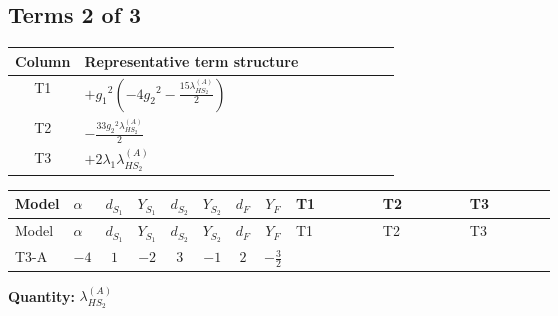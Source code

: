 \documentclass[8pt]{article}
\begin{document}
\begin{landscape}
\subsection*{Terms 2 of 3}
\begin{center}
\begin{tabular}{@{}c >{\raggedright\arraybackslash}p{0.82\linewidth}@{}}
\toprule
Column & Representative term structure \\
\midrule
T1 & \(\displaystyle +{g_1}^2 \left(-4 {g_2}^2-\frac{15 {\lambda_{HS_2}^{(A)}}}{2}\right)\) \\
\midrule
T2 & \(\displaystyle -\frac{33 {g_2}^2 {\lambda_{HS_2}^{(A)}}}{2}\) \\
\midrule
T3 & \(\displaystyle +2 {\lambda_1} {\lambda_{HS_2}^{(A)}}\) \\
\midrule
\bottomrule
\end{tabular}
\end{center}
\smallskip
\tiny
\begin{longtable}{@{}llcccccc >{\raggedright\arraybackslash}p{0.21\linewidth} >{\raggedright\arraybackslash}p{0.21\linewidth} >{\raggedright\arraybackslash}p{0.21\linewidth}@{}}
\toprule
Model & $\alpha$ & $d_{S_1}$ & $Y_{S_1}$ & $d_{S_2}$ & $Y_{S_2}$ & $d_F$ & $Y_F$ & T1 & T2 & T3 \\
\midrule
\endfirsthead
\toprule
Model & $\alpha$ & $d_{S_1}$ & $Y_{S_1}$ & $d_{S_2}$ & $Y_{S_2}$ & $d_F$ & $Y_F$ & T1 & T2 & T3 \\
\midrule
\endhead
T3-A & $-4$ & $1$ & $-2$ & $3$ & $-1$ & $2$ & $-\frac{3}{2}$ & \scriptsize\adjustbox{max width=\linewidth}{$\begin{gathered} +{g_1}^2 \left(-4 {g_2}^2-\frac{15 {\lambda_{HS_2}^{(A)}}}{2}\right)\end{gathered}$} & \scriptsize\adjustbox{max width=\linewidth}{$\begin{gathered} -\frac{33 {g_2}^2 {\lambda_{HS_2}^{(A)}}}{2}\end{gathered}$} & \scriptsize\adjustbox{max width=\linewidth}{$\begin{gathered} +2 {\lambda_1} {\lambda_{HS_2}^{(A)}}\end{gathered}$} \\
\midrule
\bottomrule
\end{longtable}
\clearpage
\noindent\textbf{Quantity: }$\lambda_{HS_2}^{(A)}$\par\smallskip

\end{landscape}
\end{document}

